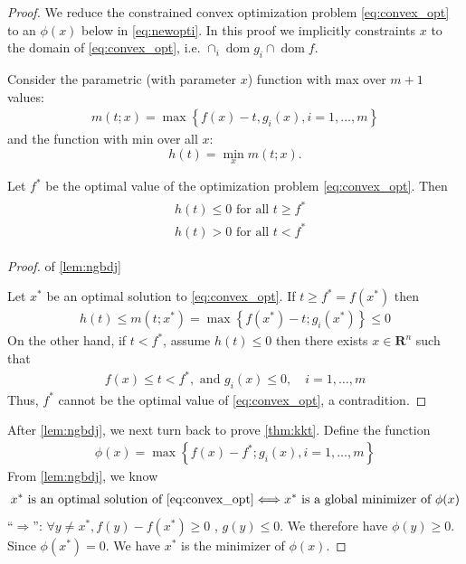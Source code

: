 \documentclass{article}
\newcommand{\dom}{\operatorname{dom}}
\begin{document}
\begin{proof}\color{ForestGreen}
We reduce the constrained convex optimization problem \cref{eq:convex_opt} to an  $\phi(x)$ below in \cref{eq:newopti}. In this proof we implicitly constraints $x$ to the domain of \cref{eq:convex_opt}, i.e. $ \cap_i \dom g_i  \cap \dom f$.

Consider the parametric (with parameter $x$) function with max over $m+1$ values:
\begin{align*}
m(t ; x)=\max \left\{f(x)-t, g_{i}(x), i=1, \ldots, m\right\}
\end{align*}
and the function with min over all $x$: $$h(t)=\min _{x} m(t ; x).$$
\begin{lema}\label{lem:ngbdj}
 Let $f^{*}$ be the optimal value of the optimization problem \cref{eq:convex_opt}. Then
\begin{align*}
\begin{aligned}
&h(t) \leq 0 \text { for all } t \geq f^{*} \\
&h(t)>0 \text { for all } t<f^{*}
\end{aligned}
\end{align*}
\end{lema} 

\begin{proof}\color{ForestGreen} of \cref{lem:ngbdj}

 Let $x^{*}$ be an optimal solution to \cref{eq:convex_opt}. If $t \geq f^{*}=f\left(x^{*}\right)$ then
\begin{align*}
h(t) \leq m\left(t ; x^{*}\right)=\max \left\{f\left(x^{*}\right)-t ; g_{i}\left(x^{*}\right)\right\}  \leq 0
\end{align*}
On the other hand, if $t<f^{*}$, assume $h(t) \leq 0$ then there exists $x \in \mathbf{R}^{n}$ such that
\begin{align*}
f(x) \leq t<f^{*}, \text { and } g_{i}(x) \leq 0, \quad i=1, \ldots, m
\end{align*}
Thus, $f^{*}$ cannot be the optimal value of \cref{eq:convex_opt}, a contradition.
\end{proof} 
After \cref{lem:ngbdj}, we next turn back to prove \cref{thm:kkt}. 
Define the  function
\begin{align}
\phi(x)=\max \left\{f(x)-f^{*} ; g_{i}(x), i=1, \ldots, m\right\}\label{eq:newopti}
\end{align}
From \cref{lem:ngbdj}, we know 
\begin{align*}
    x^{*} \text{ is an optimal solution of \cref{eq:convex_opt}} \Longleftrightarrow  x^{*} \text{ is a global minimizer of } \phi(x)
\end{align*}
``$\Rightarrow$'':  $\forall y\ne x^*, f(y)-f(x^*)\ge 0$ , $g(y)\le 0$. We therefore have $\phi(y)\ge 0$. Since $\phi(x^*)= 0$. We have $x^*$ is the minimizer of $\phi(x)$.


\end{proof}
\end{document}
